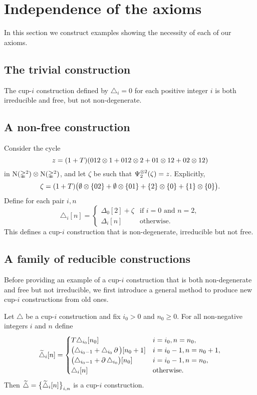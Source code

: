 \section{Independence of the axioms}

In this section we construct examples showing the necessity of each of our axioms.

\subsection{The trivial construction}

The cup-$i$ construction defined by $\triangle_i = 0$ for each positive integer $i$ is both irreducible and free, but not non-degenerate.

\subsection{A non-free construction}

Consider the cycle
\[
z = (1+T)(012 \ot 1 + 012 \ot 2 + 01 \ot 12 + 02 \ot 12)
\]
in $\chains(\gsimplex^2) \ot \chains(\gsimplex^2)$, and let $\zeta$ be such that $\Psi_2^{\ot2}(\zeta) = z$.
Explicitly,
\[
\zeta = (1+T)\big(\emptyset \ot \set{02} + \emptyset \ot \set{01} + \set{2} \ot \set{0} + \set{1} \ot \set{0}\big).
\]
Define for each pair $i,n$
\[
\triangle_i[n] =
\begin{cases}
	\Delta_0[2] + \zeta & \text{if } i=0 \text{ and } n=2, \\
	\Delta_{i}[n] & \text{otherwise}.
\end{cases}
\]
This defines a cup-$i$ construction that is non-degenerate, irreducible but not free.

\subsection{A family of reducible constructions}

Before providing an example of a cup-$i$ construction that is both non-degenerate and free but not irreducible, we first introduce a general method to produce new cup-$i$ constructions from old ones.

\begin{lemma}
	Let $\triangle$ be a cup-$i$ construction and fix $i_0>0$ and $n_0 \geq 0$.
	For all non-negative integers $i$ and $n$ define
	\[
	\widetilde\triangle_i[n] =
	\begin{cases}
		T\triangle_{i_0}[n_0] & i=i_0, n=n_0, \\
		\big(\triangle_{i_0-1} + \triangle_{i_0}\bd\big)[n_0+1] & i=i_0-1, n=n_0+1, \\
		\big(\triangle_{i_0-1} + \bd\triangle_{i_0}\big)[n_0] & i=i_0-1, n=n_0, \\
		\triangle_{i}[n] & \text{otherwise}.
	\end{cases}
	\]
	Then $\widetilde\triangle = \set[\big]{\widetilde\triangle_i[n]}_{i,n}$ is a cup-$i$ construction.
\end{lemma}

